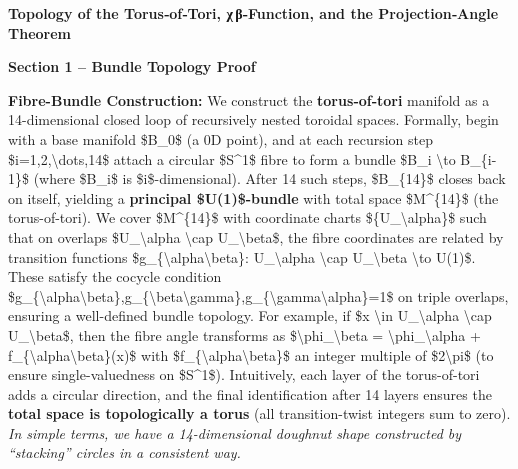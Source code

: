 \documentclass[]{article}
\date{}
\begin{document}
\textbf{Topology of the Torus‑of‑Tori, χ\,β‑Function, and the
Projection‑Angle Theorem}

\textbf{Section 1 -- Bundle Topology Proof}

\textbf{Fibre-Bundle Construction:} We construct the
\textbf{torus‑of‑tori} manifold as a 14-dimensional closed loop of
recursively nested toroidal spaces. Formally, begin with a base manifold
\$B\_0\$ (a 0D point), and at each recursion step
\$i=1,2,\textbackslash{}dots,14\$ attach a circular \$S\^{}1\$ fibre to
form a bundle \$B\_i \textbackslash{}to B\_\{i-1\}\$ (where \$B\_i\$ is
\$i\$-dimensional). After 14 such steps, \$B\_\{14\}\$ closes back on
itself, yielding a \textbf{principal \$U(1)\$-bundle} with total space
\$M\^{}\{14\}\$ (the torus-of-tori). We cover \$M\^{}\{14\}\$ with
coordinate charts \$\{U\_\textbackslash{}alpha\}\$ such that on overlaps
\$U\_\textbackslash{}alpha \textbackslash{}cap
U\_\textbackslash{}beta\$, the fibre coordinates are related by
transition functions \$g\_\{\textbackslash{}alpha\textbackslash{}beta\}:
U\_\textbackslash{}alpha \textbackslash{}cap U\_\textbackslash{}beta
\textbackslash{}to U(1)\$. These satisfy the cocycle condition
\$g\_\{\textbackslash{}alpha\textbackslash{}beta\},g\_\{\textbackslash{}beta\textbackslash{}gamma\},g\_\{\textbackslash{}gamma\textbackslash{}alpha\}=1\$
on triple overlaps, ensuring a well-defined bundle topology. For
example, if \$x \textbackslash{}in U\_\textbackslash{}alpha
\textbackslash{}cap U\_\textbackslash{}beta\$, then the fibre angle
transforms as \$\textbackslash{}phi\_\textbackslash{}beta =
\textbackslash{}phi\_\textbackslash{}alpha +
f\_\{\textbackslash{}alpha\textbackslash{}beta\}(x)\$ with
\$f\_\{\textbackslash{}alpha\textbackslash{}beta\}\$ an integer multiple
of \$2\textbackslash{}pi\$ (to ensure single-valuedness on \$S\^{}1\$).
Intuitively, each layer of the torus-of-tori adds a circular direction,
and the final identification after 14 layers ensures the \textbf{total
space is topologically a torus} (all transition-twist integers sum to
zero). \emph{In simple terms, we have a 14-dimensional doughnut shape
constructed by ``stacking'' circles in a consistent way.}
\end{document}
